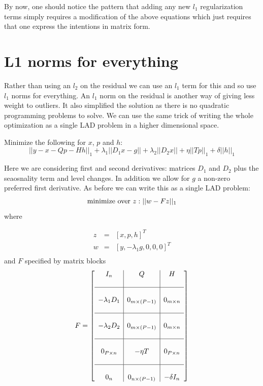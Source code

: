 \documentclass{article}
\begin{document}
By now, one should notice the pattern that adding any new $l_1$ regularization
terms simply requires a modification of the above equations which just requires
that one express the intentions in matrix form.

\section{L1 norms for everything}

Rather than using an $l_2$ on the residual we can use an $l_1$ term for this and so use
$l_1$ norms for everything. An $l_1$ norm on the residual is another way of giving less
weight to outliers. It also simplified the solution as there is no quadratic programming
problems to solve. We can use the same trick of writing the whole optimization as a single
LAD problem in a higher dimensional space.

Minimize the following for $x$, $p$ and $h$:
\begin{equation}
||y - x - Q p -H h||_1 + \lambda_1 ||D_1 x - g|| + \lambda_2 ||D_2 x||
+ \eta ||T p||_1 + \delta ||h||_1
\end{equation}

Here we are considering first and second derivatives: matrices $D_1$ and $D_2$ plus the seaosnality
term and level changes. In addition we allow for $g$ a non-zero preferred first derivative. As before
we can write this as a single LAD problem:
\[
\mbox{minimize over}~ z :  ||w-F z||_1 \\
\]
where

\begin{eqnarray}
z & = & [x, p , h]^T\\
w & = & [y, -\lambda_1 g, 0, 0, 0]^T \\
\end{eqnarray}
and $F$ specified by matrix blocks
\begin{equation}
F=\left[
\begin{array}{c|c|c}
I_n  & Q  & H \\
&\\
\hline
&\\
-\lambda_1 D_1 & 0_{m \times (P-1)} & 0_{m \times n}\\
&\\
\hline
&\\
-\lambda_2 D_2 & 0_{m \times (P-1)} & 0_{m \times n}\\
&\\
\hline
&\\
0_{P \times n} & -\eta T & 0_{P \times n} \\
&\\
\hline
&\\
0_{n} & 0_{n \times (P-1)} & -\delta I_n
\end{array}\right]
\end{equation}
\end{document}
